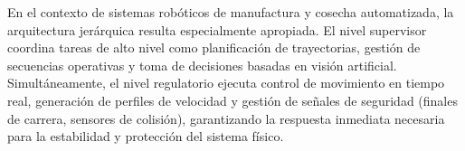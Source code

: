 En el contexto de sistemas robóticos de manufactura y cosecha automatizada, la arquitectura jerárquica resulta especialmente apropiada. El nivel supervisor coordina tareas de alto nivel como planificación de trayectorias, gestión de secuencias operativas y toma de decisiones basadas en visión artificial. Simultáneamente, el nivel regulatorio ejecuta control de movimiento en tiempo real, generación de perfiles de velocidad y gestión de señales de seguridad (finales de carrera, sensores de colisión), garantizando la respuesta inmediata necesaria para la estabilidad y protección del sistema físico.
